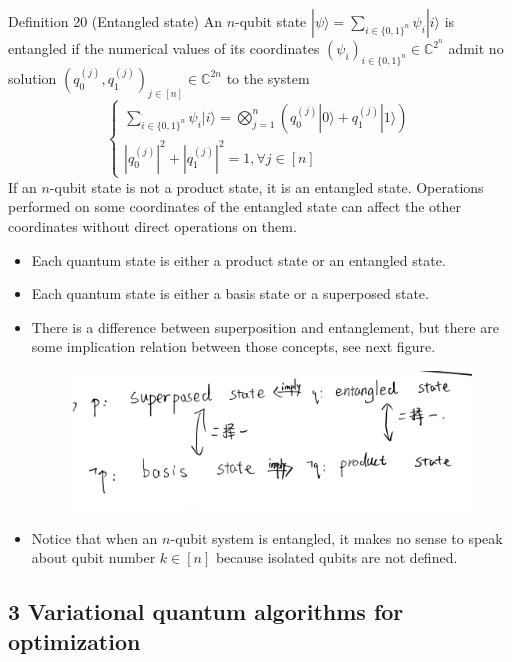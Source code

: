 Definition 20 (Entangled state) An $n$-qubit state $|\psi\rangle=\sum_{i \in\{0,1\}^{n}} \psi_{i}|i\rangle$ is entangled if the numerical values of its coordinates $\left(\psi_{i}\right)_{i \in\{0,1\}^{n}} \in \mathbb{C}^{2^{n}}$ admit no solution $\left(q_{0}^{(j)}, q_{1}^{(j)}\right)_{j \in[n]} \in \mathbb{C}^{2 n}$ to the system
$$
\left\{\begin{array}{l}
\sum_{i \in\{0,1\}^{n}} \psi_{i}|i\rangle=\bigotimes_{j=1}^{n}\left(q_{0}^{(j)}|0\rangle+q_{1}^{(j)}|1\rangle\right) \\
\left|q_{0}^{(j)}\right|^{2}+\left|q_{1}^{(j)}\right|^{2}=1, \forall j \in [n]
\end{array}\right.
$$
If an $n$-qubit state is not a product state, it is an entangled state. Operations performed on some coordinates of the entangled state can affect the other coordinates without direct operations on them.

\begin{remark}
    \begin{itemize}
        \item Each quantum state is either a product state or an entangled state.
        \item Each quantum state is either a basis state or a superposed state.
        \item There is a difference between superposition and entanglement, but there are some implication relation between those concepts, see next figure. %
\begin{figure}
    \centering
    \includegraphics[width=0.75\linewidth]{Images/relation-superposed-entangled.jpg}
\end{figure}
        \item Notice that when an $n$-qubit system is entangled, it makes no sense to speak about qubit number $k \in[n]$ because isolated qubits are not defined. 
    \end{itemize}
\end{remark}

\subsection{3 Variational quantum algorithms for optimization}

